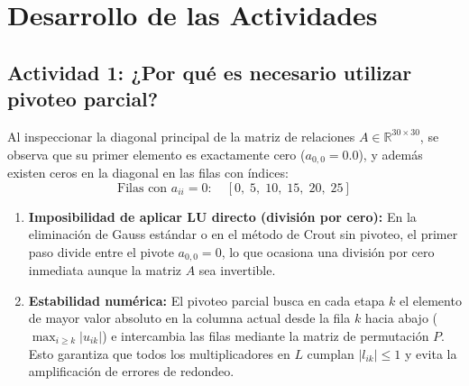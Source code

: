 \documentclass[11pt,a4paper]{article}
\begin{document}
\section{Desarrollo de las Actividades}

\subsection{Actividad 1: ¿Por qué es necesario utilizar pivoteo parcial?}
Al inspeccionar la diagonal principal de la matriz de relaciones $A \in \mathbb{R}^{30 \times 30}$, se observa que su primer elemento es exactamente cero ($a_{0,0} = 0.0$), y además existen ceros en la diagonal en las filas con índices:
\[
    \text{Filas con } a_{ii} = 0: \quad [0, \; 5, \; 10, \; 15, \; 20, \; 25]
\]
\begin{enumerate}[leftmargin=*]
    \item \textbf{Imposibilidad de aplicar LU directo (división por cero):} En la eliminación de Gauss estándar o en el método de Crout sin pivoteo, el primer paso divide entre el pivote $a_{0,0} = 0$, lo que ocasiona una división por cero inmediata aunque la matriz $A$ sea invertible.
    \item \textbf{Estabilidad numérica:} El pivoteo parcial busca en cada etapa $k$ el elemento de mayor valor absoluto en la columna actual desde la fila $k$ hacia abajo ($\max_{i \ge k} |u_{ik}|$) e intercambia las filas mediante la matriz de permutación $P$. Esto garantiza que todos los multiplicadores en $L$ cumplan $|l_{ik}| \le 1$ y evita la amplificación de errores de redondeo.
\end{enumerate}
\end{document}
